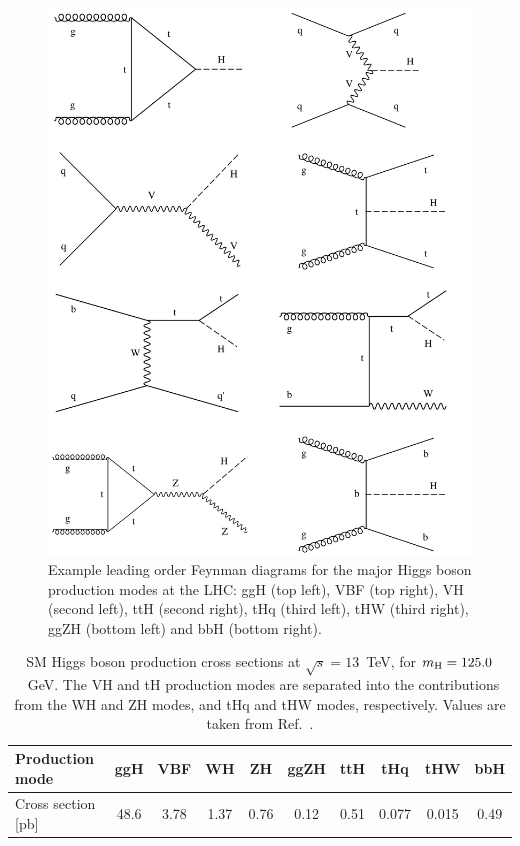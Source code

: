 \begin{figure}
  \centering
  \includegraphics[width=.8\linewidth]{Figures/theory/production_feynman.png}
  \caption[Leading order Feynman diagrams for the major Higgs boson production modes]
  {
    Example leading order Feynman diagrams for the major Higgs boson production modes at the LHC: ggH (top left), VBF (top right), VH (second left), ttH (second right), tHq (third left), tHW (third right), ggZH (bottom left) and bbH (bottom right).
  }
  \label{fig:higgs_production_feynman}
\end{figure}

\begin{table}
    \caption[Higgs boson production cross sections]{SM Higgs boson production cross sections at $\sqrt{s}=13$~TeV, for $m_{\rm{H}}=125.0$~GeV. The VH and tH production modes are separated into the contributions from the WH and ZH modes, and tHq and tHW modes, respectively. Values are taken from Ref.~\cite{deFlorian:2016spz}.}
    \label{tab:higgs_xs}
    \centering
    \footnotesize
    \setlength{\tabcolsep}{8pt}
    \renewcommand{\arraystretch}{2}
    \begin{tabular}{l|c|c|c|c|c|c|c|c|c}
        \hline
        Production mode & ggH & VBF & WH & ZH & ggZH & ttH & tHq & tHW & bbH   \\ \hline
        Cross section [pb] & 48.6 & 3.78 & 1.37 & 0.76 & 0.12 & 0.51 & 0.077 & 0.015 & 0.49 \\
        \hline
    \end{tabular}
\end{table}

